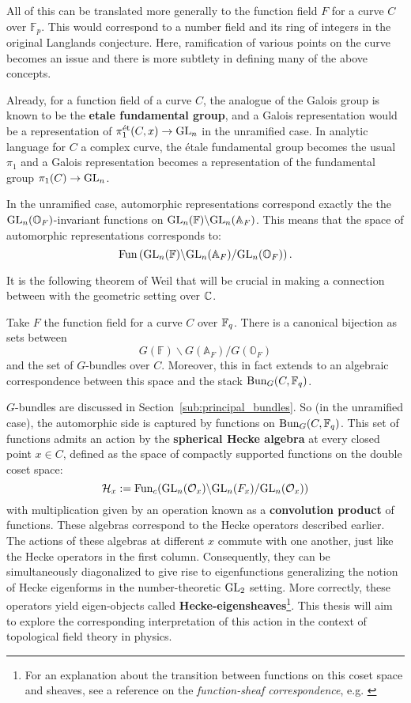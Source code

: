 All of this can be translated more generally to the function field $F$ for a curve $C$ over $\mathbb F_p$. This would correspond to a number field and its ring of integers in the original Langlands conjecture. Here, ramification of various points on the curve becomes an issue and there is more subtlety in defining many of the above concepts.

Already, for a function field of a curve $C$, the analogue of the Galois group is known to be the \textbf{etale fundamental group}, and a Galois representation would be a representation of $\pi_1^{\text{\'et}}(C,x) \to \mathrm{GL}_n$ in the unramified case. In analytic language for $C$ a complex curve, the \'etale fundamental group becomes the usual $\pi_1$ and a Galois representation becomes a representation of the fundamental group $\pi_1(C) \to \mathrm{GL}_n$. 

In the unramified case, automorphic representations correspond exactly the the $\mathrm{GL}_n(\mathbb O_F)$-invariant functions on $\mathrm{GL}_n (\mathbb F)\backslash \mathrm{GL}_n(\mathbb A_F)$. This means that the space of automorphic representations corresponds to:
\[
	\mathrm{Fun} \left(\mathrm{GL}_n (\mathbb F)\backslash \mathrm{GL}_n(\mathbb A_F)/\mathrm{GL}_n(\mathbb O_F) \right).
\]

It is the following theorem of Weil that will be crucial in making a connection between with the geometric setting over $\mathbb{C}$.
\begin{theorem}
	Take $F$ the function field for a curve $C$ over $\mathbb{F}_q$. There is a canonical bijection as sets between
	\[
		G (\mathbb F)\backslash G(\mathbb A_F)/G(\mathbb O_F)
	\]
	and the set of $G$-bundles over $C$. Moreover, this in fact extends to an algebraic correspondence between this space and the stack $\mathrm{Bun}_G(C, \mathbb{F}_q)$. 
\end{theorem}

$G$-bundles are discussed in Section~\ref{sub:principal_bundles}.
So (in the unramified case), the automorphic side is captured by functions on $\mathrm{Bun}_G(C, \mathbb{F}_q)$. 
This set of functions admits an action by the \textbf{spherical Hecke algebra} at every closed point $x \in C$, defined as the space of compactly supported functions on the double coset space:
\[
	\mathcal H_x := \mathrm{Fun}_c (\mathrm{GL}_n (\mathcal O_x)\backslash \mathrm{GL}_n(F_x)/\mathrm{GL}_n(\mathcal O_x))
\]
with multiplication given by an operation known as a \textbf{convolution product} of functions. These algebras correspond to the Hecke operators described earlier. The actions of these algebras at different $x$ commute with one another, just like the Hecke operators in the first column. Consequently, they can be simultaneously diagonalized to give rise to eigenfunctions generalizing the notion of Hecke eigenforms in the number-theoretic $\mathrm{GL}_2$ setting. More correctly, these operators yield eigen-objects called \textbf{Hecke-eigensheaves}\footnote{For an explanation about the transition between functions on this coset space and sheaves, see a reference on the \emph{function-sheaf correspondence}, e.g. \cite{shin2005}}. This thesis will aim to explore the corresponding interpretation of this action in the context of topological field theory in physics.

